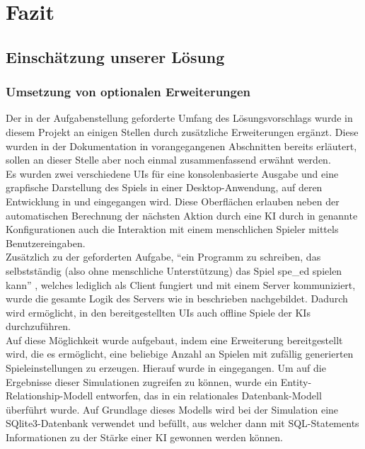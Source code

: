 \chapter{Fazit}
\label{ch:fazit}

\section{Einschätzung unserer Lösung}
\label{sec:einschaetzung}


\subsection{Umsetzung von optionalen Erweiterungen}
\label{subsec:optionale-erweiterungen}

Der in der Aufgabenstellung geforderte Umfang des Lösungsvorschlags  wurde in diesem Projekt
an einigen Stellen durch zusätzliche Erweiterungen ergänzt.
Diese wurden in der Dokumentation in vorangegangenen Abschnitten bereits erläutert, sollen an dieser Stelle aber noch
einmal zusammenfassend erwähnt werden. \\

Es wurden zwei verschiedene \ac{UI}s für eine konsolenbasierte Ausgabe und eine grapfische Darstellung des Spiels in
einer Desktop-Anwendung, auf deren Entwicklung in  und
 eingegangen wird.
Diese Oberflächen erlauben neben der automatischen Berechnung der nächsten Aktion durch eine \ac{KI} durch in
 genannte Konfigurationen auch die Interaktion mit einem menschlichen Spieler mittels
Benutzereingaben. \\

Zusätzlich zu der geforderten Aufgabe, "`ein Programm zu schreiben, das selbstständig (also ohne menschliche
Unterstützung) das Spiel spe\_ed spielen kann"' , welches lediglich als Client fungiert und
mit einem Server kommuniziert, wurde die gesamte Logik des Servers wie in 
beschrieben nachgebildet.
Dadurch wird ermöglicht, in den bereitgestellten \ac{UI}s auch offline Spiele der \ac{KI}s durchzuführen. \\

Auf diese Möglichkeit wurde aufgebaut, indem eine Erweiterung bereitgestellt wird, die es ermöglicht, eine beliebige
Anzahl an Spielen mit zufällig generierten Spieleinstellungen zu erzeugen.
Hierauf wurde in  eingegangen.
Um auf die Ergebnisse dieser Simulationen zugreifen zu können, wurde ein Entity-Relationship-Modell entworfen, das in
ein relationales Datenbank-Modell überführt wurde.
Auf Grundlage dieses Modells wird bei der Simulation eine SQlite3-Datenbank verwendet und befüllt, aus welcher dann mit
SQL-Statements Informationen zu der Stärke einer \ac{KI} gewonnen werden können. \\

